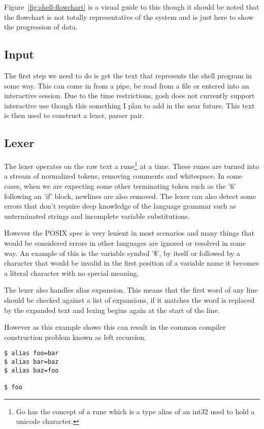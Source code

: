 Figure~\ref{fig:shell-flowchart} is a visual guide to this though it should be noted that the flowchart is not totally representative of the system and is just here to show the progression of data.


\subsection{Input}
The first step we need to do is get the text that represents the shell program in some way.
This can come in from a pipe, be read from a file or entered into an interactive session.
Due to the time restrictions, gosh does not currently support interactive use though this something I plan to add in the near future.
This text is then used to construct a lexer, parser pair.

\subsection{Lexer}
The lexer operates on the raw text a rune\footnote{Go has the concept of a rune which is a type alias of an int32 used to hold a unicode character.} at a time.
These runes are turned into a stream of normalized tokens, removing comments and whitespace.
In some cases, when we are expecting some other terminating token such as the 'fi' following an 'if' block, newlines are also removed.
The lexer can also detect some errors that don't require deep knowledge of the language grammar such as unterminated strings and incomplete variable substitutions. 

However the POSIX spec is very lenient in most scenarios and many things that would be considered errors in other languages are ignored or resolved in some way.
An example of this is the variable symbol '\$', by itself or followed by a character that would be invalid in the first position of a variable name it becomes a literal character with no special meaning.

The lexer also handles alias expansion.
This means that the first word of any line should be checked against a list of expansions, if it matches the word is replaced by the expanded text and lexing begins again at the start of the line.

However as this example shows this can result in the common compiler construction problem known as left recursion.
\begin{verbatim}
$ alias foo=bar
$ alias bar=baz
$ alias baz=foo

$ foo
\end{verbatim}

